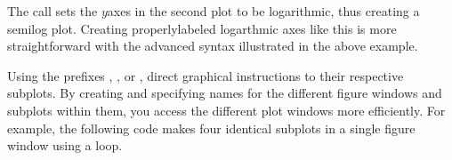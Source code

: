 \documentclass[letterpaper,10pt,english]{sphinxmanual}
\begin{document}
\sphinxAtStartPar
The call  sets the \(y\)\sphinxhyphen{}axes in the second plot to be logarithmic, thus creating a semi\sphinxhyphen{}log plot.  Creating properly\sphinxhyphen{}labeled logarthmic axes like this is more straightforward with the advanced syntax illustrated in the above example.

\sphinxAtStartPar
Using the prefixes , , or , direct graphical instructions to their respective subplots.  By creating and specifying names for the different figure windows and subplots within them, you access the different plot windows more efficiently.  For example, the following code makes four identical subplots in a single figure window using a  loop.

\begin{sphinxVerbatim}[commandchars=\\\{\},numbers=left,firstnumber=1,stepnumber=1]
  

  

  

  

  

   \PYG{p}{[}   \PYG{p}{]}
     \PYG{p}{[}\PYG{p}{]}\PYG{p}{[}\PYG{p}{]}

\end{sphinxVerbatim}

\newpage
\end{document}
